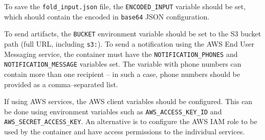 To save the \texttt{fold\_input.json} file, the \texttt{ENCODED\_INPUT} variable should be set, which should contain the encoded in \texttt{base64} JSON configuration.

To send artifacts, the \texttt{BUCKET} environment variable should be set to the S3 bucket path (full URL, including \texttt{s3:\/\/}).
To send a notification using the AWS End User Messaging service, the container must have the \texttt{NOTIFICATION\_PHONES} and \texttt{NOTIFICATION\_MESSAGE} variables set.
The variable with phone numbers can contain more than one recipient -- in such a case, phone numbers should be provided as a comma--separated list.

If using AWS services, the AWS client variables should be configured.
This can be done using environment variables such as \texttt{AWS\_ACCESS\_KEY\_ID} and \texttt{AWS\_SECRET\_ACCESS\_KEY}.
An alternative is to configure the AWS IAM role to be used by the container and have access permissions to the individual services.